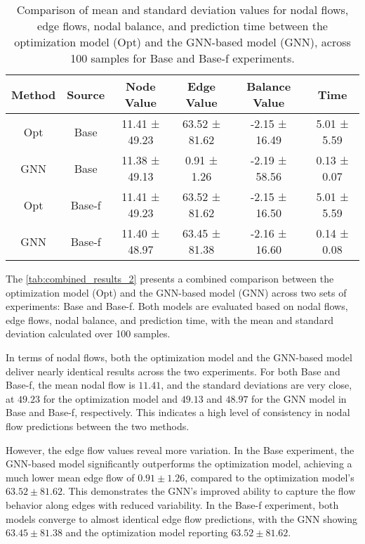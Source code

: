 \begin{table}[h]
\centering
\begin{tabular}{|c|c|c|c|c|c|}
    \hline
    Method & Source & Node Value & Edge Value & Balance Value & Time \\ \hline
    Opt    & Base   & 11.41 ± 49.23 & 63.52 ± 81.62  & -2.15 ± 16.49 & 5.01 ± 5.59 \\ \hline
    GNN    & Base   & 11.38 ± 49.13 & 0.91 ± 1.26    & -2.19 ± 58.56 & 0.13 ± 0.07 \\ \hline
    Opt    & Base-f & 11.41 ± 49.23 & 63.52 ± 81.62  & -2.15 ± 16.50 & 5.01 ± 5.59 \\ \hline
    GNN    & Base-f & 11.40 ± 48.97 & 63.45 ± 81.38  & -2.16 ± 16.60 & 0.14 ± 0.08 \\ \hline
\end{tabular}
\caption{Comparison of mean and standard deviation values for nodal flows, edge flows, nodal balance, and prediction time between the optimization model (Opt) and the GNN-based model (GNN), across 100 samples for Base and Base-f experiments.}
\label{tab:combined_results}
\end{table}



The \cref{tab:combined_results_2} presents a combined comparison between the optimization model (Opt) and the GNN-based model (GNN) across two sets of experiments: Base and Base-f. Both models are evaluated based on nodal flows, edge flows, nodal balance, and prediction time, with the mean and standard deviation calculated over 100 samples.

In terms of nodal flows, both the optimization model and the GNN-based model deliver nearly identical results across the two experiments. For both Base and Base-f, the mean nodal flow is $11.41$, and the standard deviations are very close, at $49.23$ for the optimization model and $49.13$ and $48.97$ for the GNN model in Base and Base-f, respectively. This indicates a high level of consistency in nodal flow predictions between the two methods.

However, the edge flow values reveal more variation. In the Base experiment, the GNN-based model significantly outperforms the optimization model, achieving a much lower mean edge flow of $0.91 \pm 1.26$, compared to the optimization model’s $63.52 \pm 81.62$. This demonstrates the GNN’s improved ability to capture the flow behavior along edges with reduced variability. In the Base-f experiment, both models converge to almost identical edge flow predictions, with the GNN showing $63.45 \pm 81.38$ and the optimization model reporting $63.52 \pm 81.62$.

